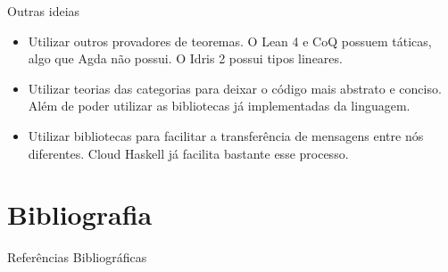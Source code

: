 \documentclass{beamer}
\begin{document}
\begin{frame}{Outras ideias}
  \begin{itemize}
  \item  Utilizar outros provadores de teoremas.
    O Lean 4 e CoQ possuem táticas, algo que Agda não possui.
    O Idris 2 possui tipos lineares. 
  \item Utilizar teorias das categorias para deixar o código mais abstrato e conciso.
    Além de poder utilizar as bibliotecas já implementadas da linguagem.
  \item Utilizar bibliotecas para facilitar a transferência de mensagens entre nós diferentes.
    Cloud Haskell já facilita bastante esse processo.
  \end{itemize}
\end{frame}


\section{Bibliografia}

\begin{frame}{Referências Bibliográficas}
  
  
\end{frame}
\end{document}
